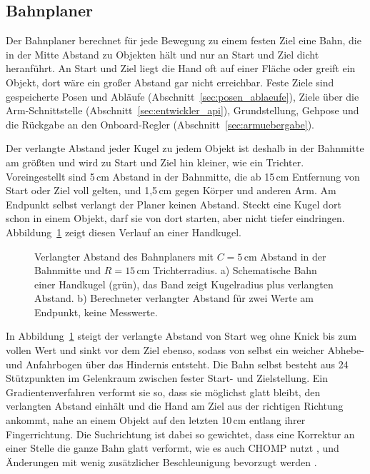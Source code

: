\subsection{Bahnplaner}
\label{sec:bahnplaner}
Der Bahnplaner berechnet für jede Bewegung zu einem festen Ziel eine Bahn, die in der Mitte Abstand zu Objekten hält und nur an Start und Ziel dicht heranführt.
An Start und Ziel liegt die Hand oft auf einer Fläche oder greift ein Objekt, dort wäre ein großer Abstand gar nicht erreichbar.
Feste Ziele sind gespeicherte Posen und Abläufe (Abschnitt~\ref{sec:posen_ablaeufe}), Ziele über die Arm-Schnittstelle (Abschnitt~\ref{sec:entwickler_api}), Grundstellung, Gehpose und die Rückgabe an den Onboard-Regler (Abschnitt~\ref{sec:armuebergabe}).

Der verlangte Abstand jeder Kugel zu jedem Objekt ist deshalb in der Bahnmitte am größten und wird zu Start und Ziel hin kleiner, wie ein Trichter.
Voreingestellt sind 5\,cm Abstand in der Bahnmitte, die ab 15\,cm Entfernung von Start oder Ziel voll gelten, und 1,5\,cm gegen Körper und anderen Arm.
Am Endpunkt selbst verlangt der Planer keinen Abstand.
Steckt eine Kugel dort schon in einem Objekt, darf sie von dort starten, aber nicht tiefer eindringen.
Abbildung~\ref{fig:trichter} zeigt diesen Verlauf an einer Handkugel.

\begin{figure}[htbp]
  \centering
  
  \caption[Trichter des Bahnplaners]{Verlangter Abstand des Bahnplaners mit $C = 5$\,cm Abstand in der Bahnmitte und $R = 15$\,cm Trichterradius. a) Schematische Bahn einer Handkugel (grün), das Band zeigt Kugelradius plus verlangten Abstand. b) Berechneter verlangter Abstand für zwei Werte am Endpunkt, keine Messwerte.}
  \label{fig:trichter}
\end{figure}

In Abbildung~\ref{fig:trichter} steigt der verlangte Abstand von Start weg ohne Knick bis zum vollen Wert und sinkt vor dem Ziel ebenso, sodass von selbst ein weicher Abhebe- und Anfahrbogen über das Hindernis entsteht.
Die Bahn selbst besteht aus 24 Stützpunkten im Gelenkraum zwischen fester Start- und Zielstellung.
Ein Gradientenverfahren verformt sie so, dass sie möglichst glatt bleibt, den verlangten Abstand einhält und die Hand am Ziel aus der richtigen Richtung ankommt, nahe an einem Objekt auf den letzten 10\,cm entlang ihrer Fingerrichtung.
Die Suchrichtung ist dabei so gewichtet, dass eine Korrektur an einer Stelle die ganze Bahn glatt verformt, wie es auch CHOMP nutzt \cite{Schulman2014}, und Änderungen mit wenig zusätzlicher Beschleunigung bevorzugt werden \cite{Zucker2013}.

